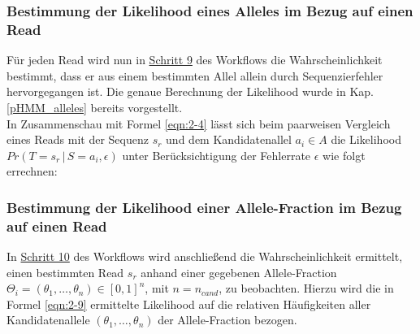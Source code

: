\subsubsection{Bestimmung der Likelihood eines Alleles im Bezug auf einen Read} \label{sol_al_read}

Für jeden Read wird nun in \hyperref[step9]{Schritt 9} des Workflows die Wahrscheinlichkeit bestimmt, dass er aus einem bestimmten Allel allein durch Sequenzierfehler hervorgegangen ist. Die genaue Berechnung der Likelihood wurde in Kap. \ref{pHMM_alleles} bereits vorgestellt. \\

In Zusammenschau mit Formel \eqref{eqn:2-4} lässt sich beim paarweisen Vergleich eines Reads mit der Sequenz $s_{r}$ und dem Kandidatenallel $a_{i} \in A $ die Likelihood $ Pr(T=s_{r} \, | \, S=a_{i}, \epsilon) $ unter Berücksichtigung der Fehlerrate $\epsilon$ wie folgt errechnen:
\vspace{-0.5cm}
\begin{center}
\end{center}

\subsubsection{Bestimmung der Likelihood einer Allele-Fraction im Bezug auf einen Read} \label{sol_vaf_one_reads}

In \hyperref[step10]{Schritt 10\label{step10txt}} des Workflows wird anschließend die Wahrscheinlichkeit ermittelt, einen bestimmten Read $s_{r}$ anhand einer gegebenen Allele-Fraction $\Theta_{i} = (\theta_{1},\dots,\theta_{n}) \in [0,1]^{n}$, mit $n=n_{cand}$, zu beobachten. Hierzu wird die in Formel \eqref{eqn:2-9} ermittelte Likelihood auf die relativen Häufigkeiten aller Kandidatenallele $ (\theta_{1},\dots,\theta_{n}) $ der Allele-Fraction bezogen.\\


